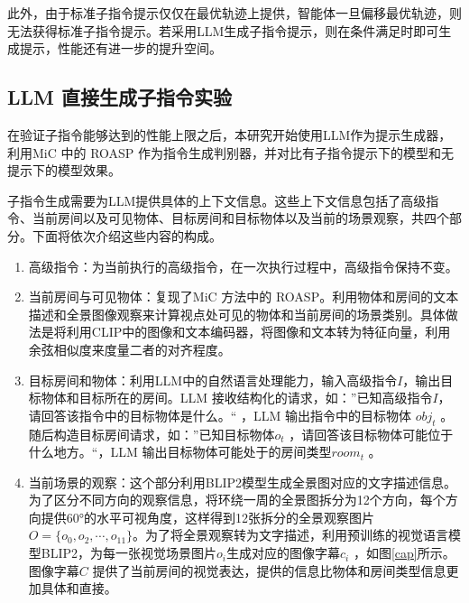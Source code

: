 \documentclass[bachelor]{thesis-uestc}
\begin{document}
此外，由于标准子指令提示仅仅在最优轨迹上提供，智能体一旦偏移最优轨迹，则无法获得标准子指令提示。若采用LLM生成子指令提示，则在条件满足时即可生成提示，性能还有进一步的提升空间。

\subsection{LLM 直接生成子指令实验}

在验证子指令能够达到的性能上限之后，本研究开始使用LLM作为提示生成器，利用MiC 中的 ROASP 作为指令生成判别器，并对比有子指令提示下的模型和无提示下的模型效果。

子指令生成需要为LLM提供具体的上下文信息。这些上下文信息包括了高级指令、当前房间以及可见物体、目标房间和目标物体以及当前的场景观察，共四个部分。下面将依次介绍这些内容的构成。

\begin{enumerate}
    \item 高级指令：为当前执行的高级指令，在一次执行过程中，高级指令保持不变。
    \item 当前房间与可见物体：复现了MiC 方法中的 ROASP。利用物体和房间的文本描述和全景图像观察来计算视点处可见的物体和当前房间的场景类别。具体做法是将利用CLIP中的图像和文本编码器，将图像和文本转为特征向量，利用余弦相似度来度量二者的对齐程度。
    \item 目标房间和物体：利用LLM中的自然语言处理能力，输入高级指令$I$，输出目标物体和目标所在的房间。LLM 接收结构化的请求，如：”已知高级指令$I$，请回答该指令中的目标物体是什么。“ ，LLM 输出指令中的目标物体 $obj_t$ 。随后构造目标房间请求，如：”已知目标物体$o_t$ ，请回答该目标物体可能位于什么地方。“，LLM 输出目标物体可能处于的房间类型$room_t$ 。
    \item 当前场景的观察：这个部分利用BLIP2模型生成全景图对应的文字描述信息。为了区分不同方向的观察信息，将环绕一周的全景图拆分为12个方向，每个方向提供60°的水平可视角度，这样得到12张拆分的全景观察图片$O=\{o_0,o_2,\cdots,o_{11}\}$。为了将全景观察转为文字描述，利用预训练的视觉语言模型BLIP2，为每一张视觉场景图片$o_i$生成对应的图像字幕$c_i$ ，如图\ref{cap}所示。图像字幕$C$ 提供了当前房间的视觉表达，提供的信息比物体和房间类型信息更加具体和直接。
\end{enumerate}
\end{document}

